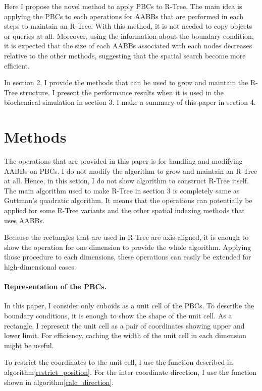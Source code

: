 \documentclass[10pt,letterpaper,twocolumn]{article}
\begin{document}
Here I propose the novel method to apply PBCs to R-Tree. The main idea is
applying the PBCs to each operations for AABBs that are performed in each steps to
maintain an R-Tree. With this method, it is not needed to copy objects or
queries at all. Moreover, using the information about the boundary condition,
it is expected that the size of each AABBs associated with each nodes decreases
relative to the other methods, suggesting that the spatial search become more
efficient.

In section 2, I provide the methods that can be used to grow and maintain the
R-Tree structure. I present the performance results when it is used in the
biochemical simulation in section 3. I make a summary of this paper in section 4.

\section*{Methods}

The operations that are provided in this paper is for handling and modifying
AABBs on PBCs. I do not modify the algorithm to grow and maintain an R-Tree at all.
Hence, in this setion, I do not show algorithm to construct R-Tree itself.
The main algorithm used to make R-Tree in section 3 is completely same as Guttman's
quadratic algorithm.
It means that the operations can potentially be applied for some R-Tree variants
and the other spatial indexing methods that uses AABBs.

Because the rectangles that are used in R-Tree are axis-aligned, it is
enough to show the operation for one dimension to provide the whole algorithm.
Applying those procedure to each dimensions, these operations can easily be
extended for high-dimensional cases.

\paragraph{Representation of the PBCs.}
In this paper, I consider only cuboids as a unit cell of the PBCs.
To describe the boundary conditions, it is enough to show the shape of the unit
cell. As a rectangle, I represent the unit cell as a pair of coordinates showing
upper and lower limit. For efficiency, caching the width of the unit cell in
each dimension might be useful.

To restrict the coordinates to the unit cell, I use the function described in
algorithm\ref{restrict_position}. For the inter coordinate direction, I use the
function shown in algorithm\ref{calc_direction}. 
\end{document}
